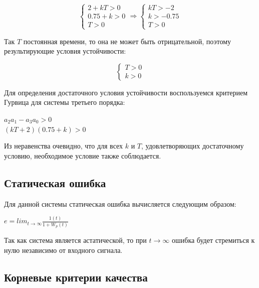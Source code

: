 \documentclass[14pt,a4paper,report]{report}
\begin{document}
	\begin{equation*}
	\begin{cases}
	\text{$2+kT>0$} \\
	\text{$0.75+k>0$} \\
	\text{$T>0$}
	\end{cases}
	\Longrightarrow
	\begin{cases}
	\text{$kT>-2$} \\
	\text{$k>-0.75$} \\
	\text{$T>0$}
	\end{cases}
	\end{equation*}
	
	Так $T$ постоянная времени, то она не может быть отрицательной, поэтому результирующие условия устойчивости:
	
	\begin{equation*}
	\begin{cases}
	\text{$T>0$} \\
	\text{$k>0$}
	\end{cases}
	\end{equation*}
	
	Для определения достаточного условия устойчивости воспользуемся критерием Гурвица для системы третьего порядка:
	
	\begin{center}
		$a_2a_1-a_3a_0>0$ \\
		$(kT+2)(0.75+k)>0$ \\
	\end{center}
	
	Из неравенства очевидно, что для всех $k$ и $T$, удовлетворяющих достаточному условию, необходимое условие также соблюдается.
	
	\subsection{Статическая ошибка}
	
	Для данной системы статическая ошибка вычисляется следующим образом:
	
	\begin{center}
		$e=lim_{t\rightarrow\infty}\frac{1(t)}{1+W_p(t)}$
	\end{center}
	
	Так как система является астатической, то при $t\rightarrow\infty$ ошибка будет стремиться к нулю независимо от входного сигнала.
	
	\subsection{Корневые критерии качества}
	
\end{document}
